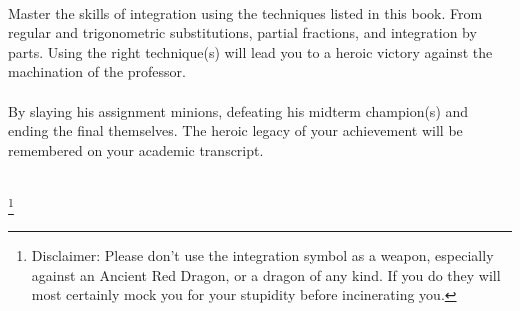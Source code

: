 \documentclass[letterpaper,10pt,twoside,twocolumn,openany]{book}
\begin{document}
                       
\frontmatter                           
\begin{titlepage}
  ~
    \newpage
    
    \begin{center}
        

        \large
        \vspace*{\fill}
        Master the skills of integration using the techniques listed in this book. From regular and trigonometric substitutions, partial fractions, and integration by parts. Using the right technique(s) will lead you to a heroic victory against the machination of the professor. 
        \\~\\
        By slaying his assignment minions, defeating his midterm champion(s) and ending the final themselves. The heroic legacy of your achievement will be remembered on your academic transcript.
        \\~\\
        \vspace*{\fill}

    \end{center}
    \let\thefootnote\relax\footnote{Disclaimer: Please don't use the integration symbol as a weapon, especially against an Ancient Red Dragon, or a dragon of any kind. If you do they will most certainly mock you for your stupidity before incinerating you.}
\end{titlepage}
\end{document}
